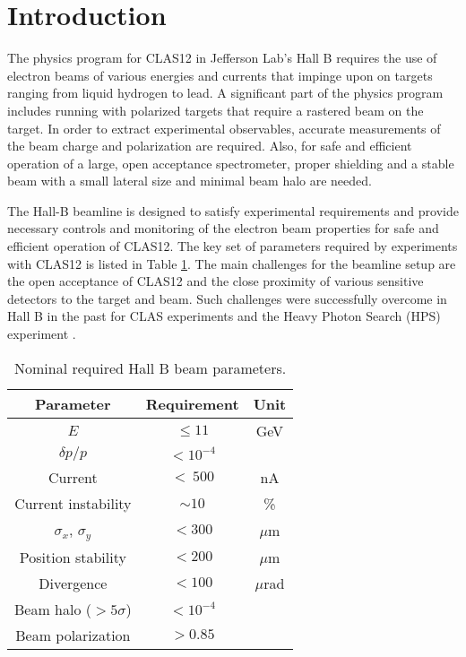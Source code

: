 \section{Introduction}
\label{introduction}

The physics program for CLAS12 in Jefferson Lab's Hall B requires the use of electron beams of various energies and currents that impinge
upon on targets ranging from liquid hydrogen to lead. A significant part of the physics program includes running with polarized targets that 
require a rastered beam on the target. In order to extract experimental observables, accurate measurements of the beam charge and 
polarization are required. Also, for safe and efficient operation of a large, open acceptance spectrometer, proper shielding and a stable beam 
with a small lateral size and minimal beam halo are needed. 

The Hall-B beamline is designed to satisfy experimental requirements and provide necessary controls and monitoring 
of the electron beam properties for safe and efficient operation of CLAS12. The key set of parameters required by experiments with CLAS12 
is listed in Table \ref{tab:beam_par}. The main challenges for the beamline setup are the open acceptance of CLAS12 and the close proximity 
of various sensitive detectors to the target and beam. Such challenges were successfully overcome in Hall B in the past for CLAS \cite{CLAS} 
experiments and the Heavy Photon Search (HPS) experiment \cite{HPS}.

 \begin{table}[htb]
 \centering
 \begin{tabular}{|c|c|c|}
\hline
Parameter & Requirement &Unit \\ \hline 
$E$ &  $\le 11$& GeV \\ \hline
$\delta p/p$ & $< 10^{-4}$ & \\ \hline 
Current & $<~500$ & nA \\ \hline
Current instability & $\sim 10$ &\% \\ \hline 
$\sigma_x $, $\sigma_y$&$< 300$& $\mu$m \\ \hline 
Position stability &$< 200$ &$\mu$m \\ \hline
Divergence& $< 100$& $\mu$rad \\ \hline 
Beam halo ($> 5\sigma$) &$< 10^{-4}$& \\ \hline
Beam polarization &$> 0.85$& \\ \hline
\end{tabular}
\caption{Nominal required Hall B beam parameters.} 
\label{tab:beam_par}
\end{table}

